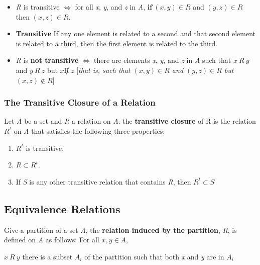 \documentclass[12pt]{article}
\begin{document}
\begin{description}
\begin{itemize}
\item \textit{R} is transitive \hspace{10pt} $\Leftrightarrow$ \hspace{10pt} for all \textit{x}, \textit{y}, and \textit{z} in \textit{A}, $\textbf{if} \ (x, y) \in R$ and $(y, z) \in R$ then $(x, z) \in R$.
\item \textbf{Transitive} If any one element is related to a second and that second element is related to a third, then the first element is related to the third.
\item \textit{R} is \textbf{not transitive} \hspace{10pt} $\Leftrightarrow$ \hspace{10pt} there are elements \textit{x}, \textit{y}, and \textit{z} in \textit{A} such that $x \ R \ y$ and $y \ R \ z$ but $x \not R \ z$ [\textit{that is, such that $(x, y) \in R$ and $(y, z) \in R$ but $(x, z) \not \in R$}]
\end{itemize}
\end{description}

\subsubsection*{The Transitive Closure of a Relation}
Let \textit{A} be a set and \textit{R} a relation on \textit{A}. the \textbf{transitive closure} of R is the relation $R^t$ on \textit{A} that satisfies the following three properties:

\begin{enumerate}
\item $R^t$ is transitive.
\item $R \subset R^t$.
\item If \textit{S} is any other transitive relation that contains \textit{R}, then $R^t \subset S$
\end{enumerate}

\subsection{Equivalence Relations}
Give a partition of a set \textit{A}, the \textbf{relation induced by the partition}, \textit{R}, is defined on \textit{A} as follows: For all $x, y \in A$,

\begin{center}
$x \ R \ y$ \hspace{10pt} there is a subset $A_i$ of the partition such that both \textit{x} and \textit{y} are in \textit{$A_i$}
\end{center}
\end{document}

